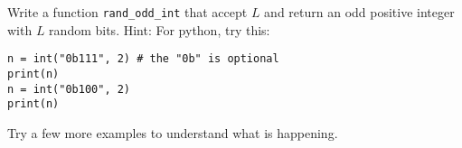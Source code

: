   Write a function \verb!rand_odd_int! that accept $L$ and return an odd
  positive integer with $L$ random bits.
  Hint: For python, try this:
  \begin{Verbatim}[frame=single,fontsize=\footnotesize]
n = int("0b111", 2) # the "0b" is optional
print(n)
n = int("0b100", 2)    
print(n)
  \end{Verbatim}
  Try a few more examples to understand what is happening.
